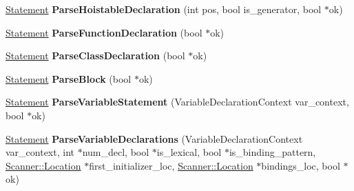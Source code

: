 \begin{DoxyCompactItemize}
\item 
\hyperlink{classv8_1_1internal_1_1_pre_parser_statement}{Statement} {\bfseries Parse\+Hoistable\+Declaration} (int pos, bool is\+\_\+generator, bool $\ast$ok)\hypertarget{classv8_1_1internal_1_1_pre_parser_a293c2f74c74fa3040224b6e4917a4999}{}\label{classv8_1_1internal_1_1_pre_parser_a293c2f74c74fa3040224b6e4917a4999}

\item 
\hyperlink{classv8_1_1internal_1_1_pre_parser_statement}{Statement} {\bfseries Parse\+Function\+Declaration} (bool $\ast$ok)\hypertarget{classv8_1_1internal_1_1_pre_parser_a25b9d345e6e8b9a9fe370f0a0a1b2bb2}{}\label{classv8_1_1internal_1_1_pre_parser_a25b9d345e6e8b9a9fe370f0a0a1b2bb2}

\item 
\hyperlink{classv8_1_1internal_1_1_pre_parser_statement}{Statement} {\bfseries Parse\+Class\+Declaration} (bool $\ast$ok)\hypertarget{classv8_1_1internal_1_1_pre_parser_a9114eef78cd1f23a2a6c420bfe654ea5}{}\label{classv8_1_1internal_1_1_pre_parser_a9114eef78cd1f23a2a6c420bfe654ea5}

\item 
\hyperlink{classv8_1_1internal_1_1_pre_parser_statement}{Statement} {\bfseries Parse\+Block} (bool $\ast$ok)\hypertarget{classv8_1_1internal_1_1_pre_parser_adfa0374a5174aca74add9f088ded250c}{}\label{classv8_1_1internal_1_1_pre_parser_adfa0374a5174aca74add9f088ded250c}

\item 
\hyperlink{classv8_1_1internal_1_1_pre_parser_statement}{Statement} {\bfseries Parse\+Variable\+Statement} (Variable\+Declaration\+Context var\+\_\+context, bool $\ast$ok)\hypertarget{classv8_1_1internal_1_1_pre_parser_a18a94e6c8f564448883b7bd82b8ef800}{}\label{classv8_1_1internal_1_1_pre_parser_a18a94e6c8f564448883b7bd82b8ef800}

\item 
\hyperlink{classv8_1_1internal_1_1_pre_parser_statement}{Statement} {\bfseries Parse\+Variable\+Declarations} (Variable\+Declaration\+Context var\+\_\+context, int $\ast$num\+\_\+decl, bool $\ast$is\+\_\+lexical, bool $\ast$is\+\_\+binding\+\_\+pattern, \hyperlink{structv8_1_1internal_1_1_scanner_1_1_location}{Scanner\+::\+Location} $\ast$first\+\_\+initializer\+\_\+loc, \hyperlink{structv8_1_1internal_1_1_scanner_1_1_location}{Scanner\+::\+Location} $\ast$bindings\+\_\+loc, bool $\ast$ok)\hypertarget{classv8_1_1internal_1_1_pre_parser_a899afa5c3caa367764930a0905a093bb}{}\label{classv8_1_1internal_1_1_pre_parser_a899afa5c3caa367764930a0905a093bb}


\end{DoxyCompactItemize}
